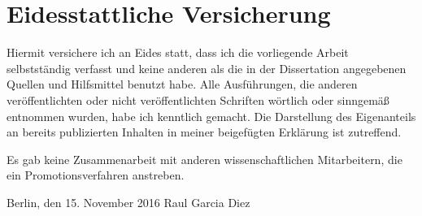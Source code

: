 
\section*{Eidesstattliche Versicherung}
\vspace{3ex}

Hiermit versichere ich an Eides statt, dass ich die vorliegende Arbeit selbstständig verfasst und keine anderen als die in der Dissertation angegebenen Quellen und Hilfsmittel benutzt habe.
Alle Ausführungen, die anderen veröffentlichten oder nicht veröffentlichten Schriften wörtlich oder sinngemäß entnommen wurden, habe ich kenntlich gemacht.
Die Darstellung des Eigenanteils an bereits publizierten Inhalten in meiner beigefügten Erklärung ist zutreffend.

Es gab keine Zusammenarbeit mit anderen wissenschaftlichen Mitarbeitern, die ein Promotionsverfahren anstreben.

\vspace{3cm}

\noindent Berlin, den 15. November 2016 \hfill Raul Garcia Diez

\cleardoublepage
